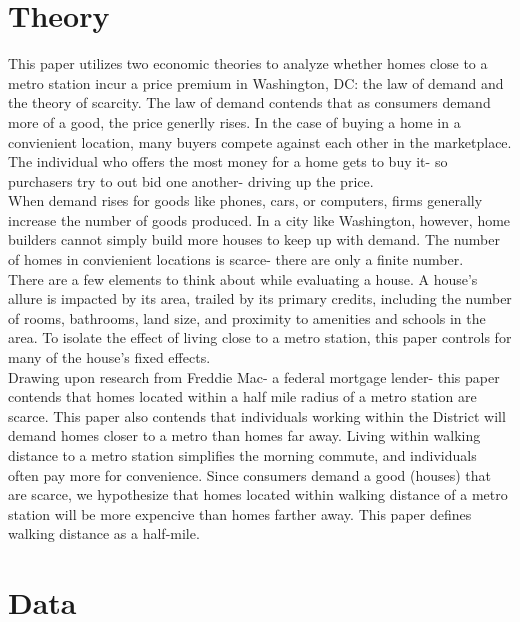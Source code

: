 \documentclass[12pt]{report}
\newcommand\tab[1][.50cm]{\hspace*{#1}}
\begin{document}
\section*{Theory}
This paper utilizes two economic theories to analyze whether homes close to a metro station incur a price premium in Washington, DC: the law of demand and the theory of scarcity. The law of demand contends that as consumers demand more of a good, the price generlly rises. In the case of buying a home in a convienient location, many buyers compete against each other in the marketplace. The individual who offers the most money for a home gets to buy it- so purchasers try to out bid one another- driving up the price.\\ When demand rises for goods like phones, cars, or computers, firms generally increase the number of goods produced. In a city like Washington, however, home builders cannot simply build more houses to keep up with demand. The number of homes in convienient locations is scarce- there are only a finite number.\\
\tab There are a few elements to think about while evaluating a house. A house's allure is impacted by its area, trailed by its primary credits, including the number of rooms, bathrooms, land size, and proximity to amenities and schools in the area. To isolate the effect of living close to a metro station, this paper controls for many of the house's fixed effects.\\
\tab Drawing upon research from Freddie Mac- a federal mortgage lender- this paper contends that homes located within a half mile radius of a metro station are scarce. This paper also contends that individuals working within the District will demand homes closer to a metro than homes far away. Living within walking distance to a metro station simplifies the morning commute, and individuals often pay more for convenience. Since consumers demand a good (houses) that are scarce, we hypothesize that homes located within walking distance of a metro station will be more expencive than homes farther away. This paper defines walking distance as a half-mile.


\section*{Data}
\end{document}
